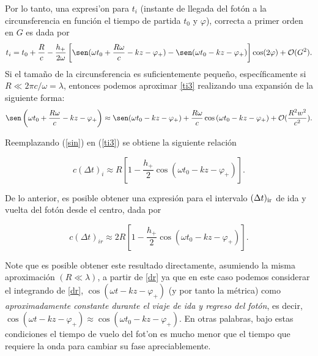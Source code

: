 Por lo tanto, una expresi'on para $t_i$ (instante de llegada del fot\'on a la circunsferencia en funci\'on el tiempo de partida $t_0$ y $\varphi$), correcta a primer orden en $G$ es dada por
\begin{equation}
t_i=t_0+\frac{R}{c}-\frac{h_+}{2\omega}\left[\sen(\omega t_0+\frac{R\omega}{c}-kz-\varphi_+)-\sen(\omega t_0-kz-\varphi_+)\right]\cos(2\varphi)+\mathcal{O}(G^2). \label{ti3}
\end{equation}
Si el tama\~no de la circunsferencia es suficientemente peque\~no, espec\'ificamente si $R\ll 2\pi c/\omega=\lambda$, entonces podemos aproximar \eqref{ti3} realizando una expansi\'on de la siguiente forma:
\begin{equation}
\sen\left(\omega t_0+\frac{R\omega}{c}-kz-\varphi_+\right)\approx \sen(\omega t_0-kz-\varphi_+)+\frac{R\omega}{c}\cos\left(\omega t_0-kz-\varphi_+ \right)+\mathcal{O}(\frac{R^2 w^2}{c^2}) .\label{sin}
\end{equation}

Reemplazando (\ref{sin}) en (\ref{ti3}) se obtiene la siguiente relaci\'on

\begin{equation}
c(\Delta t)_i\approx R\left[1-\frac{h_+}{2}\cos(\omega t_0-kz-\varphi_+) \right].
\end{equation}

De lo anterior, es posible obtener una expresi\'on para el intervalo $(\Delta t)_{\rm ir}$ de ida y vuelta del fot\'on desde el centro, dada por

\begin{equation}
c(\Delta t)_{ir}\approx 2R\left[1-\frac{h_+}{2}\cos(\omega t_0-kz-\varphi_+) \right]. \label{tir}
\end{equation}

Note que es posible obtener este resultado directamente, asumiendo la misma aproximaci\'on $(R\ll \lambda)$, a partir de \eqref{dr} ya que en este caso podemos considerar el integrando de \eqref{dr}, $\cos(\omega t-kz-\varphi_+)$ (y por tanto la m\'etrica) como \textit{aproximadamente constante durante el viaje de ida y regreso del fot\'on}, es decir, $\cos(\omega t-kz-\varphi_+)\approx \cos(\omega t_0-kz-\varphi_+)$. En otras palabras, bajo estas condiciones el tiempo de vuelo del fot'on es mucho menor que el tiempo que requiere la onda para cambiar su fase apreciablemente.

